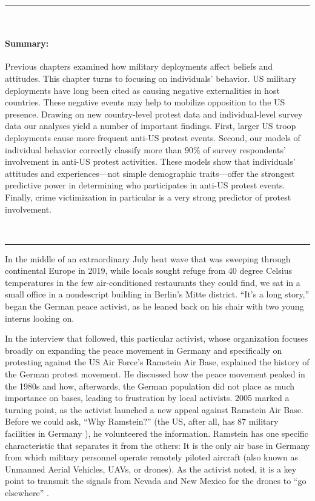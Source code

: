 


\vspace*{-0.5cm}
\rule{\linewidth}{0.10pt} \\[-1cm]
{\footnotesize\paragraph{Summary:}  Previous chapters examined how military deployments affect beliefs and attitudes. This chapter turns to focusing on individuals' behavior. US military deployments have long been cited as causing negative externalities in host countries. These negative events may help to mobilize opposition to the US presence. Drawing on new country-level protest data and individual-level survey data our analyses yield a number of important findings. First, larger US troop deployments cause more frequent anti-US protest events. Second, our models of individual behavior correctly classify more than 90\% of survey respondents' involvement in anti-US protest activities. These models show that individuals' attitudes and experiences---not simple demographic traits---offer the strongest predictive power in determining who participates in anti-US protest events. Finally, crime victimization in particular is a very strong predictor of protest involvement.} 
\\[-0.5cm] 
\rule{\linewidth}{0.10pt}

\vspace*{0.5cm}

In the middle of an extraordinary July heat wave that was sweeping through continental Europe in 2019, while locals sought refuge from 40 degree Celsius temperatures in the few air-conditioned restaurants they could find, we sat in a small office in a nondescript building in Berlin's Mitte district. ``It's a long story,'' began the German peace activist, as he leaned back on his chair with two young interns looking on. 

In the interview that followed, this particular activist, whose organization focuses broadly on expanding the peace movement in Germany and specifically on protesting against the US Air Force's Ramstein Air Base, explained the history of the German protest movement. He discussed how the peace movement peaked in the 1980s and how, afterwards, the German population did not place as much importance on bases, leading to frustration by local activists. 2005 marked a turning point, as the activist launched a new appeal against Ramstein Air Base. Before we could ask, ``Why Ramstein?'' (the US, after all, has 87 military facilities in Germany \cite{DOD2018}), he volunteered the information. Ramstein has one specific characteristic that separates it from the others: It is the only air base in Germany from which military personnel operate remotely piloted aircraft (also known as Unmanned Aerial Vehicles, UAVs, or drones). As the activist noted, it is a key point to transmit the signals from Nevada and New Mexico for the drones to ``go elsewhere'' \cite{berlinone20190723}. 

